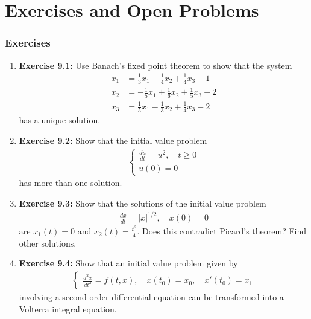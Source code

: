 \documentclass[aspectratio=169,10pt]{beamer}
\begin{document}
\section{Exercises and Open Problems}

\begin{frame}[allowframebreaks]
\frametitle{Exercises}

\begin{enumerate}
    \item \textbf{Exercise 9.1:} Use Banach's fixed point theorem to show that the system
    \begin{align*}
    x_1 &= \frac{1}{3}x_1 - \frac{1}{4}x_2 + \frac{1}{4}x_3 - 1\\
    x_2 &= -\frac{1}{5}x_1 + \frac{1}{6}x_2 + \frac{1}{5}x_3 + 2\\
    x_3 &= \frac{1}{5}x_1 - \frac{1}{3}x_2 + \frac{1}{4}x_3 - 2
    \end{align*}
    has a unique solution.

    \vspace{0.3cm}

    \item \textbf{Exercise 9.2:} Show that the initial value problem
    \begin{align*}
    \begin{cases}
    \frac{du}{dt} = u^2, \quad t \geq 0\\
    u(0) = 0
    \end{cases}
    \end{align*}
    has more than one solution.

    \vspace{0.3cm}

    \item \textbf{Exercise 9.3:} Show that the solutions of the initial value problem
    \begin{align*}
    \frac{dx}{dt} = |x|^{1/2}, \quad x(0) = 0
    \end{align*}
    are $x_1(t) = 0$ and $x_2(t) = \frac{t^2}{4}$. Does this contradict Picard's theorem?
    Find other solutions.

\framebreak

    \item \textbf{Exercise 9.4:} Show that an initial value problem given by
    \begin{align*}
    \begin{cases}
    \frac{d^2x}{dt^2} = f(t, x), \quad x(t_0) = x_0, \quad x'(t_0) = x_1
    \end{cases}
    \end{align*}
    involving a second-order differential equation can be transformed into a
    Volterra integral equation.


\end{enumerate}
\end{frame}
\end{document}
